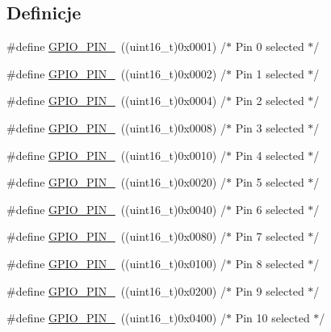 \subsection*{Definicje}
\begin{DoxyCompactItemize}
\item 
\#define \hyperlink{group___g_p_i_o__pins__define_ga176efbf43a259b7bb0a85a47401505be}{G\+P\+I\+O\+\_\+\+P\+I\+N\+\_}~((uint16\+\_\+t)0x0001)  /$\ast$ Pin 0 selected    $\ast$/
\item 
\#define \hyperlink{group___g_p_i_o__pins__define_ga6c35af4e75c3cb57bb650feaa7a136b5}{G\+P\+I\+O\+\_\+\+P\+I\+N\+\_}~((uint16\+\_\+t)0x0002)  /$\ast$ Pin 1 selected    $\ast$/
\item 
\#define \hyperlink{group___g_p_i_o__pins__define_ga6eee38b797a7268f04357dfa2759efd2}{G\+P\+I\+O\+\_\+\+P\+I\+N\+\_}~((uint16\+\_\+t)0x0004)  /$\ast$ Pin 2 selected    $\ast$/
\item 
\#define \hyperlink{group___g_p_i_o__pins__define_gadcaf899c018a0dde572b5af783565c62}{G\+P\+I\+O\+\_\+\+P\+I\+N\+\_}~((uint16\+\_\+t)0x0008)  /$\ast$ Pin 3 selected    $\ast$/
\item 
\#define \hyperlink{group___g_p_i_o__pins__define_gab3871e35868deecd260e586ad70d4b83}{G\+P\+I\+O\+\_\+\+P\+I\+N\+\_}~((uint16\+\_\+t)0x0010)  /$\ast$ Pin 4 selected    $\ast$/
\item 
\#define \hyperlink{group___g_p_i_o__pins__define_ga01cc9ed93f6fd12fd3403362779aaa18}{G\+P\+I\+O\+\_\+\+P\+I\+N\+\_}~((uint16\+\_\+t)0x0020)  /$\ast$ Pin 5 selected    $\ast$/
\item 
\#define \hyperlink{group___g_p_i_o__pins__define_ga9089f18f20ec88ee38ce6f27389e6d7e}{G\+P\+I\+O\+\_\+\+P\+I\+N\+\_}~((uint16\+\_\+t)0x0040)  /$\ast$ Pin 6 selected    $\ast$/
\item 
\#define \hyperlink{group___g_p_i_o__pins__define_ga482cb86c2f036e630661a41e8986bcfe}{G\+P\+I\+O\+\_\+\+P\+I\+N\+\_}~((uint16\+\_\+t)0x0080)  /$\ast$ Pin 7 selected    $\ast$/
\item 
\#define \hyperlink{group___g_p_i_o__pins__define_gaf5eb6a42a4428e236bd4fd08ade71e7a}{G\+P\+I\+O\+\_\+\+P\+I\+N\+\_}~((uint16\+\_\+t)0x0100)  /$\ast$ Pin 8 selected    $\ast$/
\item 
\#define \hyperlink{group___g_p_i_o__pins__define_ga4c503cb4a0dc0d18261080051d9c2daf}{G\+P\+I\+O\+\_\+\+P\+I\+N\+\_}~((uint16\+\_\+t)0x0200)  /$\ast$ Pin 9 selected    $\ast$/
\item 
\#define \hyperlink{group___g_p_i_o__pins__define_gac102c0123cb8bcadc5b590cd940b9e20}{G\+P\+I\+O\+\_\+\+P\+I\+N\+\_}~((uint16\+\_\+t)0x0400)  /$\ast$ Pin 10 selected   $\ast$/

\end{DoxyCompactItemize}
